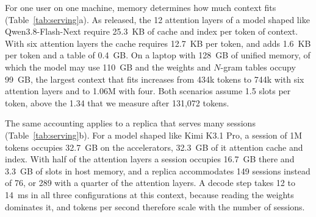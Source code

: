 For one user on one machine, memory determines how much context fits (Table~\ref{tab:serving}a).
As released, the 12 attention layers of a model shaped like Qwen3.8-Flash-Next require 25.3~KB of
cache and index per token of context. With six attention layers the cache requires 12.7~KB per
token, and \ingram{} adds 1.6~KB per token and a table of 0.4~GB. On a laptop with 128~GB of
unified memory, of which the model may use 110~GB and the weights and $N$-gram tables occupy
99~GB, the largest context that fits increases from 434k tokens to 744k with six
attention layers and to 1.06M with four. Both scenarios assume 1.5 slots per token, above the 1.34
that we measure after 131,072 tokens.

The same accounting applies to a replica that serves many sessions (Table~\ref{tab:serving}b). For
a model shaped like Kimi K3.1 Pro, a session of 1M tokens occupies 32.7~GB on the accelerators,
32.3~GB of it attention cache and index. With half of the attention layers a session occupies
16.7~GB there and 3.3~GB of \ingram{} slots in host memory, and a replica accommodates 149
sessions instead of 76, or 289 with a quarter of the attention layers. A decode step
takes 12 to 14~ms in all three configurations at this context, because reading the weights
dominates it, and tokens per second therefore scale with the number of sessions.
